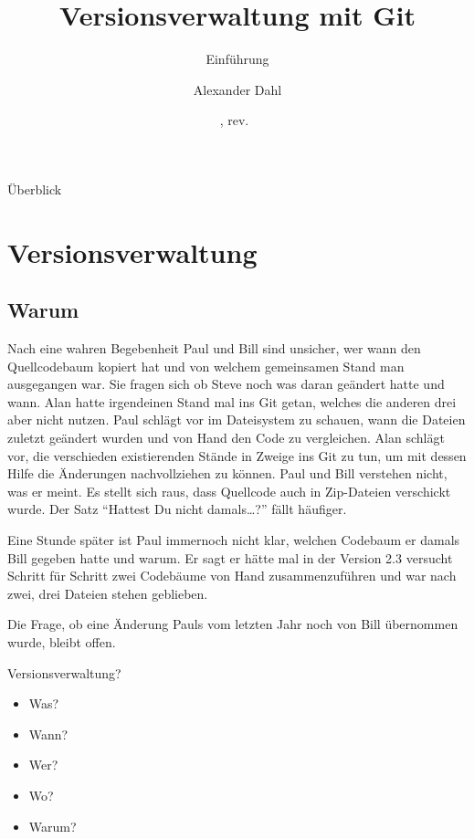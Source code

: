 \documentclass{beamer}
\title{Versionsverwaltung mit Git}
\subtitle{Einführung}
\author{Alexander Dahl}
\institute{Netz39 e.\,V.}
\date{\gitAuthorDate, rev.~\gitAbbrevHash}
\begin{document}
\begin{frame}
	\titlepage
\end{frame}

\logo{
    
}

\begin{frame}{Überblick}
    \tableofcontents
\end{frame}

\section{Versionsverwaltung}

\subsection{Warum}

\begin{frame}{Nach eine wahren Begebenheit}
    Paul und Bill sind unsicher, wer wann den Quellcodebaum kopiert hat
    und von welchem gemeinsamen Stand man ausgegangen war. Sie fragen
    sich ob Steve noch was daran geändert hatte und wann. Alan hatte
    irgendeinen Stand mal ins Git getan, welches die anderen drei aber
    nicht nutzen. Paul schlägt vor im Dateisystem zu schauen, wann die
    Dateien zuletzt geändert wurden und von Hand den Code zu
    vergleichen. Alan schlägt vor, die verschieden existierenden Stände
    in Zweige ins Git zu tun, um mit dessen Hilfe die Änderungen
    nachvollziehen zu können. Paul und Bill verstehen nicht, was er
    meint. Es stellt sich raus, dass Quellcode auch in Zip-Dateien
    verschickt wurde. Der Satz \enquote{Hattest Du nicht damals…?} fällt
    häufiger.

    Eine Stunde später ist Paul immernoch nicht klar, welchen Codebaum
    er damals Bill gegeben hatte und warum. Er sagt er hätte mal in der
    Version 2.3 versucht Schritt für Schritt zwei Codebäume von Hand
    zusammenzuführen und war nach zwei, drei Dateien stehen geblieben.

    Die Frage, ob eine Änderung Pauls vom letzten Jahr noch von Bill
    übernommen wurde, bleibt offen.
\end{frame}

\begin{frame}{Versionsverwaltung?}
    \begin{itemize}
        \item Was?
        \item Wann?
        \item Wer?
        \item Wo?
        \item Warum?
    \end{itemize}
\end{frame}
\end{document}
